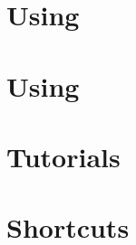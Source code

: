 \documentclass[openany]{book}
\begin{document}
\chapter{Using \swOutputConverter \label{ch:swOutputConverter}}



\chapter{Using \swPostProcess \label{ch:swPostProcess}}





\chapter{Tutorials \label{ch:tuto}}


%
%
%



\chapter{Shortcuts \label{ch:shortcuts}}

\end{document}
